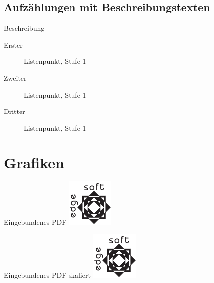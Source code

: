 	\subsection{Aufzählungen mit Beschreibungstexten}

	\begin{frame}{Beschreibung}
		\begin{description}
			\item[Erster] Listenpunkt, Stufe 1
			\item[Zweiter] Listenpunkt, Stufe 1
			\item[Dritter] Listenpunkt, Stufe 1
		\end{description}
	\end{frame}

	\section{Grafiken}

	\begin{frame}{Eingebundenes PDF}
		\includegraphics{testlogo}
	\end{frame}

	\begin{frame}{Eingebundenes PDF skaliert}
		\includegraphics[width=\textwidth]{testlogo}
	\end{frame}


